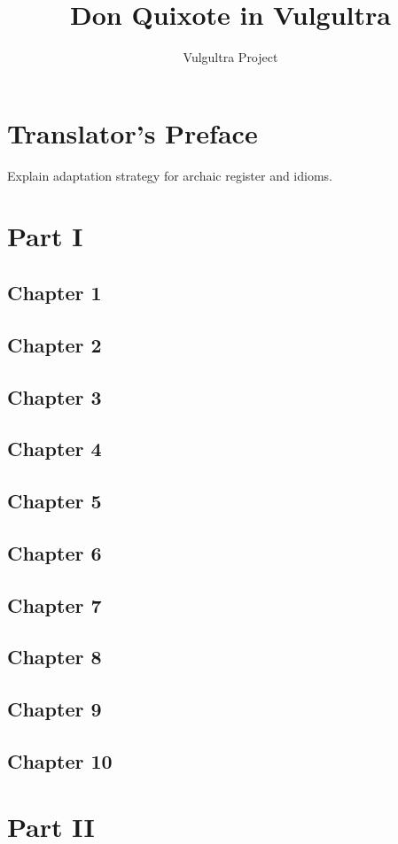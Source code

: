 \documentclass[12pt]{book}
\title{Don Quixote in Vulgultra}
\author{Vulgultra Project}
\date{}
\begin{document}
\maketitle
\tableofcontents

\chapter{Translator's Preface}
Explain adaptation strategy for archaic register and idioms.

\chapter{Part I}
\section{Chapter 1}
\section{Chapter 2}
\section{Chapter 3}
\section{Chapter 4}
\section{Chapter 5}
\section{Chapter 6}
\section{Chapter 7}
\section{Chapter 8}
\section{Chapter 9}
\section{Chapter 10}

\chapter{Part II}
\end{document}
